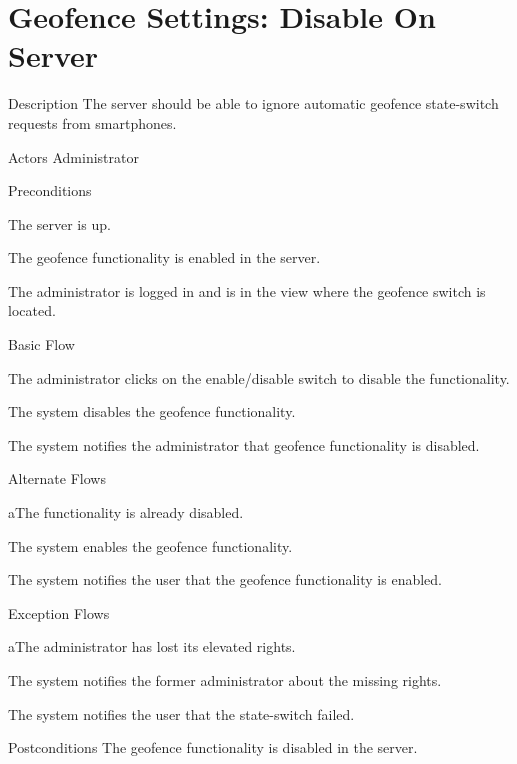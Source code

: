 \section{Geofence Settings: Disable On Server}

%
\begin{cpart}{Description}
The server should be able to ignore automatic geofence state-switch requests from smartphones.
\end{cpart}


%
\begin{cpart}{Actors}
Administrator
\end{cpart}

%
\begin{cpartList}{Preconditions}
\item The server is up.
\item The geofence functionality is enabled in the server.
\item The administrator is logged in and is in the view where the geofence switch is located.
\end{cpartList}

%
\begin{cpartList}{Basic Flow}
  \item The administrator clicks on the enable/disable switch to disable the functionality.
  \item The system disables the geofence functionality.
  \item The system notifies the administrator that geofence functionality is disabled.
\end{cpartList}

%
\begin{cpartList}{Alternate Flows}
  \begin{innerList}{1}{a}{The functionality is already disabled.}
    \item The system enables the geofence functionality.
    \item The system notifies the user that the geofence functionality is enabled.
  \end{innerList}
\end{cpartList}

%
\begin{cpartList}{Exception Flows}
  \begin{innerList}{1}{a}{The administrator has lost its elevated rights.}
    \item The system notifies the former administrator about the missing rights.
    \item The system notifies the user that the state-switch failed.
  \end{innerList}
\end{cpartList}

%
\begin{cpart}{Postconditions}
The geofence functionality is disabled in the server.
\end{cpart}

\clearpage
